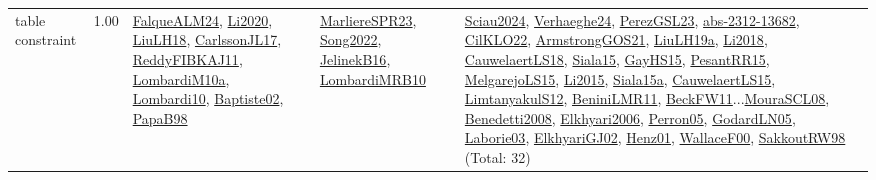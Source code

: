 {\begin{longtable}{p{3cm}r>{\raggedright\arraybackslash}p{6cm}>{\raggedright\arraybackslash}p{6cm}>{\raggedright\arraybackslash}p{8cm}}
\index{table constraint}\index{Constraints!table constraint}table constraint &  1.00 & \hyperref[detail:FalqueALM24]{FalqueALM24}, \hyperref[detail:Li2020]{Li2020}, \hyperref[detail:LiuLH18]{LiuLH18}, \hyperref[detail:CarlssonJL17]{CarlssonJL17}, \hyperref[detail:ReddyFIBKAJ11]{ReddyFIBKAJ11}, \hyperref[detail:LombardiM10a]{LombardiM10a}, \hyperref[detail:Lombardi10]{Lombardi10}, \hyperref[detail:Baptiste02]{Baptiste02}, \hyperref[detail:PapaB98]{PapaB98} & \hyperref[detail:MarliereSPR23]{MarliereSPR23}, \hyperref[detail:Song2022]{Song2022}, \hyperref[detail:JelinekB16]{JelinekB16}, \hyperref[detail:LombardiMRB10]{LombardiMRB10} & \hyperref[detail:Sciau2024]{Sciau2024}, \hyperref[detail:Verhaeghe24]{Verhaeghe24}, \hyperref[detail:PerezGSL23]{PerezGSL23}, \hyperref[detail:abs-2312-13682]{abs-2312-13682}, \hyperref[detail:CilKLO22]{CilKLO22}, \hyperref[detail:ArmstrongGOS21]{ArmstrongGOS21}, \hyperref[detail:LiuLH19a]{LiuLH19a}, \hyperref[detail:Li2018]{Li2018}, \hyperref[detail:CauwelaertLS18]{CauwelaertLS18}, \hyperref[detail:Siala15]{Siala15}, \hyperref[detail:GayHS15]{GayHS15}, \hyperref[detail:PesantRR15]{PesantRR15}, \hyperref[detail:MelgarejoLS15]{MelgarejoLS15}, \hyperref[detail:Li2015]{Li2015}, \hyperref[detail:Siala15a]{Siala15a}, \hyperref[detail:CauwelaertLS15]{CauwelaertLS15}, \hyperref[detail:LimtanyakulS12]{LimtanyakulS12}, \hyperref[detail:BeniniLMR11]{BeniniLMR11}, \hyperref[detail:BeckFW11]{BeckFW11}...\hyperref[detail:MouraSCL08]{MouraSCL08}, \hyperref[detail:Benedetti2008]{Benedetti2008}, \hyperref[detail:Elkhyari2006]{Elkhyari2006}, \hyperref[detail:Perron05]{Perron05}, \hyperref[detail:GodardLN05]{GodardLN05}, \hyperref[detail:Laborie03]{Laborie03}, \hyperref[detail:ElkhyariGJ02]{ElkhyariGJ02}, \hyperref[detail:Henz01]{Henz01}, \hyperref[detail:WallaceF00]{WallaceF00}, \hyperref[detail:SakkoutRW98]{SakkoutRW98} (Total: 32)\\
\end{longtable}
}

\clearpage
